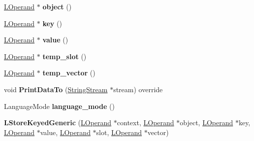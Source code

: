 \begin{DoxyCompactItemize}
\item 
\hyperlink{classv8_1_1internal_1_1_l_operand}{L\+Operand} $\ast$ {\bfseries object} ()\hypertarget{classv8_1_1internal_1_1_l_store_keyed_generic_af1106ab73c930b73c937d138a3b68d6e}{}\label{classv8_1_1internal_1_1_l_store_keyed_generic_af1106ab73c930b73c937d138a3b68d6e}

\item 
\hyperlink{classv8_1_1internal_1_1_l_operand}{L\+Operand} $\ast$ {\bfseries key} ()\hypertarget{classv8_1_1internal_1_1_l_store_keyed_generic_a8e5ab828ddbab917cc744e7c6022259d}{}\label{classv8_1_1internal_1_1_l_store_keyed_generic_a8e5ab828ddbab917cc744e7c6022259d}

\item 
\hyperlink{classv8_1_1internal_1_1_l_operand}{L\+Operand} $\ast$ {\bfseries value} ()\hypertarget{classv8_1_1internal_1_1_l_store_keyed_generic_ae0648fd1acbfca9be9ecd39a179ebb13}{}\label{classv8_1_1internal_1_1_l_store_keyed_generic_ae0648fd1acbfca9be9ecd39a179ebb13}

\item 
\hyperlink{classv8_1_1internal_1_1_l_operand}{L\+Operand} $\ast$ {\bfseries temp\+\_\+slot} ()\hypertarget{classv8_1_1internal_1_1_l_store_keyed_generic_a2badce4286c0f26664dbddd0e2b29846}{}\label{classv8_1_1internal_1_1_l_store_keyed_generic_a2badce4286c0f26664dbddd0e2b29846}

\item 
\hyperlink{classv8_1_1internal_1_1_l_operand}{L\+Operand} $\ast$ {\bfseries temp\+\_\+vector} ()\hypertarget{classv8_1_1internal_1_1_l_store_keyed_generic_a8e332b61e68443ed2a912b79cbf01438}{}\label{classv8_1_1internal_1_1_l_store_keyed_generic_a8e332b61e68443ed2a912b79cbf01438}

\item 
void {\bfseries Print\+Data\+To} (\hyperlink{classv8_1_1internal_1_1_string_stream}{String\+Stream} $\ast$stream) override\hypertarget{classv8_1_1internal_1_1_l_store_keyed_generic_ab0d8e8441ce3f1b71da8ce0ccf807df8}{}\label{classv8_1_1internal_1_1_l_store_keyed_generic_ab0d8e8441ce3f1b71da8ce0ccf807df8}

\item 
Language\+Mode {\bfseries language\+\_\+mode} ()\hypertarget{classv8_1_1internal_1_1_l_store_keyed_generic_a279b2804fdca1b8181ce7a4b2e7a0d88}{}\label{classv8_1_1internal_1_1_l_store_keyed_generic_a279b2804fdca1b8181ce7a4b2e7a0d88}

\item 
{\bfseries L\+Store\+Keyed\+Generic} (\hyperlink{classv8_1_1internal_1_1_l_operand}{L\+Operand} $\ast$context, \hyperlink{classv8_1_1internal_1_1_l_operand}{L\+Operand} $\ast$object, \hyperlink{classv8_1_1internal_1_1_l_operand}{L\+Operand} $\ast$key, \hyperlink{classv8_1_1internal_1_1_l_operand}{L\+Operand} $\ast$value, \hyperlink{classv8_1_1internal_1_1_l_operand}{L\+Operand} $\ast$slot, \hyperlink{classv8_1_1internal_1_1_l_operand}{L\+Operand} $\ast$vector)\hypertarget{classv8_1_1internal_1_1_l_store_keyed_generic_af091880976ae47ab5668f689b739343e}{}\label{classv8_1_1internal_1_1_l_store_keyed_generic_af091880976ae47ab5668f689b739343e}


\end{DoxyCompactItemize}
